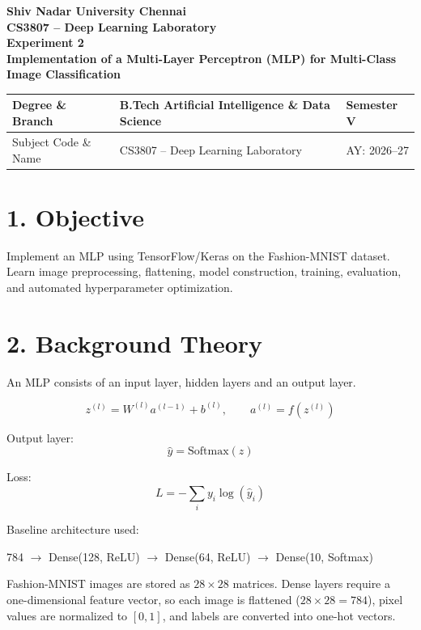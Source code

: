 \documentclass[11pt]{article}
\begin{document}
\begin{center}
{\Large\textbf{Shiv Nadar University Chennai}}\\
\textbf{CS3807 -- Deep Learning Laboratory}\\
\textbf{Experiment 2}\\
{\large\textbf{Implementation of a Multi-Layer Perceptron (MLP) for Multi-Class Image Classification}}
\end{center}

\renewcommand{\arraystretch}{1.25}

\begin{tabular}{|p{3.8cm}|p{8cm}|p{2cm}|}
\hline
Degree \& Branch & B.Tech Artificial Intelligence \& Data Science & Semester V\\ \hline
Subject Code \& Name & CS3807 -- Deep Learning Laboratory & AY: 2026--27\\ \hline
\end{tabular}

\section*{1. Objective}
Implement an MLP using TensorFlow/Keras on the Fashion-MNIST dataset. Learn image preprocessing, flattening, model construction, training, evaluation, and automated hyperparameter optimization.

\section*{2. Background Theory}
An MLP consists of an input layer, hidden layers and an output layer.

\[
z^{(l)}=W^{(l)}a^{(l-1)}+b^{(l)},\qquad
a^{(l)}=f(z^{(l)})
\]

Output layer:
\[
\hat y=\mathrm{Softmax}(z)
\]

Loss:
\[
L=-\sum_i y_i\log(\hat y_i)
\]

Baseline architecture used:

\begin{center}
784 $\rightarrow$ Dense(128, ReLU) $\rightarrow$ Dense(64, ReLU) $\rightarrow$ Dense(10, Softmax)
\end{center}

Fashion-MNIST images are stored as $28\times28$ matrices. Dense layers require a one-dimensional feature vector, so each image is flattened ($28\times28=784$), pixel values are normalized to $[0,1]$, and labels are converted into one-hot vectors.
\end{document}
